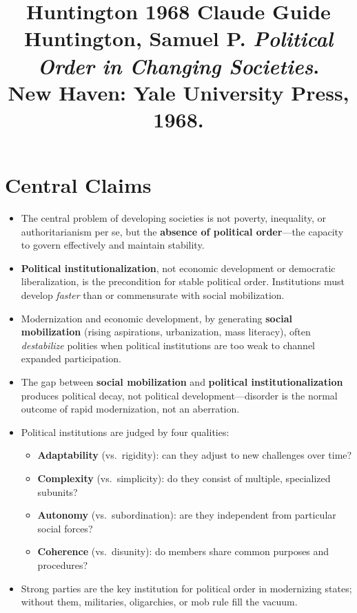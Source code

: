 \documentclass[12pt]{article}
\title{\textbf{Huntington 1968 Claude Guide}\\
\large Huntington, Samuel P. \textit{Political Order in Changing Societies}.\\
New Haven: Yale University Press, 1968.}
\author{}
\date{}
\begin{document}
\maketitle
\tableofcontents
\newpage

\section{Central Claims}

\begin{itemize}[leftmargin=*, itemsep=4pt]
    \item The central problem of developing societies is not poverty, inequality, or authoritarianism per se, but the \textbf{absence of political order}---the capacity to govern effectively and maintain stability.
    \item \textbf{Political institutionalization}, not economic development or democratic liberalization, is the precondition for stable political order. Institutions must develop \emph{faster} than or commensurate with social mobilization.
    \item Modernization and economic development, by generating \textbf{social mobilization} (rising aspirations, urbanization, mass literacy), often \emph{destabilize} polities when political institutions are too weak to channel expanded participation.
    \item The gap between \textbf{social mobilization} and \textbf{political institutionalization} produces political decay, not political development---disorder is the normal outcome of rapid modernization, not an aberration.
    \item Political institutions are judged by four qualities:
        \begin{itemize}
            \item \textbf{Adaptability} (vs.\ rigidity): can they adjust to new challenges over time?
            \item \textbf{Complexity} (vs.\ simplicity): do they consist of multiple, specialized subunits?
            \item \textbf{Autonomy} (vs.\ subordination): are they independent from particular social forces?
            \item \textbf{Coherence} (vs.\ disunity): do members share common purposes and procedures?
        \end{itemize}
    \item Strong parties are the key institution for political order in modernizing states; without them, militaries, oligarchies, or mob rule fill the vacuum.

\end{itemize}
\end{document}
